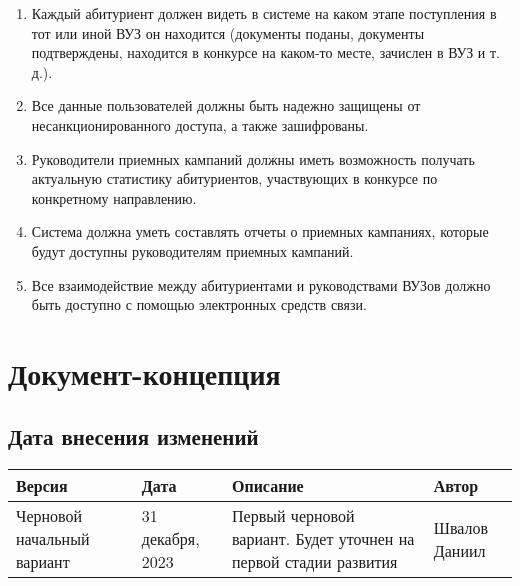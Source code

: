 \documentclass[a4paper, 14pt]{extarticle}
\begin{document}
\begin{enumerate}[leftmargin=*]
  \item Каждый абитуриент должен видеть в системе на каком этапе поступления в
  тот или иной ВУЗ он находится (документы поданы, документы подтверждены,
  находится в конкурсе на каком-то месте, зачислен в ВУЗ и т. д.).
  \item Все данные пользователей должны быть надежно защищены от
  несанкционированного доступа, а также зашифрованы.
  \item Руководители приемных кампаний должны иметь возможность получать
  актуальную статистику абитуриентов, участвующих в конкурсе по конкретному
  направлению.
  \item Система должна уметь составлять отчеты о приемных кампаниях, которые
  будут доступны руководителям приемных кампаний.
  \item Все взаимодействие между абитуриентами и руководствами ВУЗов должно быть
  доступно с помощью электронных средств связи.
\end{enumerate}

\newpage

\section{Документ-концепция}

\subsection*{Дата внесения изменений}

\begin{table}[H]
  \begin{tabular}{|L{0.17\textwidth}|L{0.19\textwidth}|L{0.4\textwidth}|L{0.15\textwidth}|}
    \hline
    \textbf{Версия}                                                  &
    \textbf{Дата}                                                    &
    \textbf{Описание}                                                &
    \textbf{Автор}                                                     \\
    \hline
    Черновой начальный вариант                                       &
    31 декабря, 2023                                                 &
    Первый черновой вариант. Будет уточнен на первой стадии развития &
    Швалов Даниил                                                      \\
    \hline
  \end{tabular}
\end{table}
\end{document}
